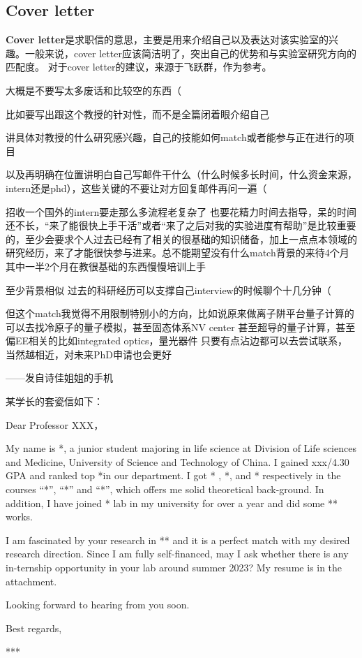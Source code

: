 \subsection{Cover letter}
\textbf{Cover letter}是求职信的意思，主要是用来介绍自己以及表达对该实验室的兴趣。一般来说，cover letter应该简洁明了，突出自己的优势和与实验室研究方向的匹配度。
对于cover letter的建议，来源于飞跃群，作为参考。

\begin{presentbox}
大概是不要写太多废话和比较空的东西（

比如要写出跟这个教授的针对性，而不是全篇闭着眼介绍自己

讲具体对教授的什么研究感兴趣，自己的技能如何match或者能参与正在进行的项目

以及再明确在位置讲明白自己写邮件干什么（什么时候多长时间，什么资金来源，intern还是phd），这些关键的不要让对方回复邮件再问一遍（

招收一个国外的intern要走那么多流程老复杂了 也要花精力时间去指导，呆的时间还不长，“来了能很快上手干活”或者“来了之后对我的实验进度有帮助”是比较重要的，至少会要求个人过去已经有了相关的很基础的知识储备，加上一点点本领域的研究经历，来了才能很快参与进来。总不能期望没有什么match背景的来待4个月 其中一半2个月在教很基础的东西慢慢培训上手

至少背景相似 过去的科研经历可以支撑自己interview的时候聊个十几分钟（

但这个match我觉得不用限制特别小的方向，比如说原来做离子阱平台量子计算的可以去找冷原子的量子模拟，甚至固态体系NV center 甚至超导的量子计算，甚至偏EE相关的比如integrated optics，量光器件 只要有点沾边都可以去尝试联系，当然越相近，对未来PhD申请也会更好

\hfill ——发自诗佳姐姐的手机
\end{presentbox}

某学长的套瓷信如下：

\begin{presentbox}

\noindent Dear Professor XXX，

\noindent My name is *, a junior student majoring in life science at Division of Life sciences and Medicine, University of Science and Technology of China. I gained xxx/4.30 GPA and ranked top *in our department. I got * , *, and * respectively in the courses “*”, “*” and “*”, which offers me solid theoretical back-ground. In addition, I have joined * lab in my university for over a year and did some ** works.

\noindent I am fascinated by your research in ** and it is a perfect match with my desired research direction. Since I am fully self-financed, may I ask whether there is any in-ternship opportunity in your lab around summer 2023? My resume is in the attachment.

\noindent Looking forward to hearing from you soon.

\noindent Best regards,

***
\end{presentbox}

